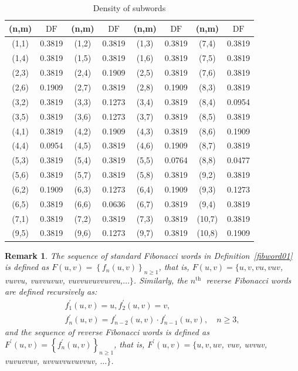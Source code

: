 \documentclass[12pt, a4paper]{article}
\newtheorem{remark}{Remark}
\begin{document}
\begin{table}[H]
    \centering
   \begin{tabular}{|c|c|c|c|c|c|c|c|}
\hline
\textbf{(n,m)} & $\operatorname{DF}$ & \textbf{(n,m)} & $\operatorname{DF}$ & \textbf{(n,m)} & $\operatorname{DF}$ & \textbf{(n,m)} & $\operatorname{DF}$ \\ \hline
(1,1) & 0.3819 & (1,2) & 0.3819 & (1,3) & 0.3819 &(7,4) & 0.3819  \\ \hline
(1,4) & 0.3819 & (1,5) & 0.3819 & (1,6) & 0.3819 &(7,5) & 0.3819 \\ \hline
(2,3) & 0.3819 & (2,4) & 0.1909 & (2,5) & 0.3819 &(7,6) & 0.3819 \\ \hline
(2,6) & 0.1909 & (2,7) & 0.3819 & (2,8) & 0.1909 & (8,3) & 0.3819\\ \hline
(3,2) & 0.3819 & (3,3) & 0.1273 & (3,4) & 0.3819 & (8,4) & 0.0954 \\ \hline
(3,5) & 0.3819 & (3,6) & 0.1273 & (3,7) & 0.3819 & (8,5) & 0.3819 \\ \hline
(4,1) & 0.3819 & (4,2) & 0.1909 & (4,3) & 0.3819 & (8,6) & 0.1909\\ \hline
(4,4) & 0.0954 & (4,5) & 0.3819 & (4,6) & 0.1909 & (8,7) & 0.3819\\ \hline
(5,3) & 0.3819 & (5,4) & 0.3819 & (5,5) & 0.0764 & (8,8) & 0.0477 \\ \hline
(5,6) & 0.3819 & (5,7) & 0.3819 & (5,8) & 0.3819 & (9,2) & 0.3819 \\ \hline
(6,2) & 0.1909 & (6,3) & 0.1273 & (6,4) & 0.1909 & (9,3) & 0.1273 \\ \hline
(6,5) & 0.3819 & (6,6) & 0.0636 & (6,7) & 0.3819 & (9,4) & 0.3819 \\ \hline
(7,1) & 0.3819 & (7,2) & 0.3819 & (7,3) & 0.3819& (10,7) & 0.3819 \\ \hline
(9,5) & 0.3819 & (9,6) & 0.1273 & (9,7) & 0.3819 & (10,8) & 0.1909\\ \hline
\end{tabular}
    \caption{Density of subwords}
    \label{tab:my_den}
\end{table}
\begin{remark}
The sequence of standard Fibonacci words in Definition~\ref{fibword01} is defined as $F(u, v)=\left\{f_n(u, v)\right\}_{n \geq 1}$, that is, $F(u, v)=\{u, v, v u, v u v$, vuvvu, vuvvuvuv, vuvvuvuvvuvvu,$\ldots\}$. Similarly, the $n^{\text {th }}$ reverse Fibonacci words are defined recursively as:
$$
\begin{gathered}
f_1^{\prime}(u, v)=u, f_2^{\prime}(u, v)=v, \\
f_n^{\prime}(u, v)=f_{n-2}^{\prime}(u, v) \cdot f_{n-1}^{\prime}(u, v), \quad n \geq 3,
\end{gathered}
$$
and the sequence of reverse Fibonacci words is defined as $F^{\prime}(u, v)=\left\{f_n^{\prime}(u, v)\right\}_{n \geq 1}$, that is, $F^{\prime}(u, v)=\{u, v, u v$, vuv, uvvuv, vuvuvvuv, uvvuvvuvuvvuv, $\ldots\}$.
\end{remark}
\end{document}
